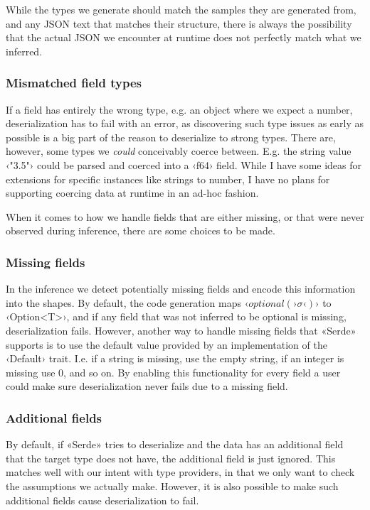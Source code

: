 While the types we generate should match the samples they are generated from, and any JSON text that matches their structure, there is always the possibility that the actual JSON we encounter at runtime does not perfectly match what we inferred.

\subsubsection{Mismatched field types}

If a field has entirely the wrong type, e.g. an object where we expect a number, deserialization has to fail with an error, as discovering such type issues as early as possible is a big part of the reason to deserialize to strong types. There are, however, some types we \emph{could} conceivably coerce between. E.g. the string value ‹"3.5"› could be parsed and coerced into a ‹f64› field. While I have some ideas for extensions for specific instances like strings to number, I have no plans for supporting coercing data at runtime in an ad-hoc fashion.

When it comes to how we handle fields that are either missing, or that were never observed during inference, there are some choices to be made.

\subsubsection{Missing fields}

In the inference we detect potentially missing fields and encode this information into the shapes. By default, the code generation maps $‹optional(›\sigma‹)›$ to ‹Option<T>›, and if any field that was not inferred to be optional is missing, deserialization fails. However, another way to handle missing fields that «Serde» supports is to use the default value provided by an implementation of the ‹Default› trait. I.e. if a string is missing, use the empty string, if an integer is missing use 0, and so on. By enabling this functionality for every field a user could make sure deserialization never fails due to a missing field.

\subsubsection{Additional fields}

By default, if «Serde» tries to deserialize and the data has an additional field that the target type does not have, the additional field is just ignored. This matches well with our intent with type providers, in that we only want to check the assumptions we actually make. However, it is also possible to make such additional fields cause deserialization to fail.


